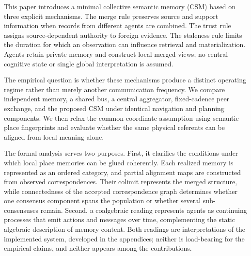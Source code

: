 \documentclass{article}
\begin{document}
This paper introduces a minimal collective semantic memory (CSM) based
on three explicit mechanisms. The merge rule preserves source and
support information when records from different agents are combined.
The trust rule assigns source-dependent authority to foreign evidence.
The staleness rule limits the duration for which an observation can
influence retrieval and materialization. Agents retain private memory
and construct local merged views; no central cognitive state or
single global interpretation is assumed.

The empirical question is whether these mechanisms produce a distinct
operating regime rather than merely another communication frequency.
We compare independent memory, a shared bus, a central aggregator,
fixed-cadence peer exchange, and the proposed CSM under identical
navigation and planning components. We then relax the common-coordinate
assumption using semantic place fingerprints and evaluate whether the
same physical referents can be aligned from local meaning alone.

The formal analysis serves two purposes. First, it clarifies the
conditions under which local place memories can be glued coherently.
Each realized memory is represented as an ordered category, and
partial alignment maps are constructed from observed correspondences.
Their colimit represents the merged structure, while connectedness of
the accepted correspondence graph determines whether one consensus
component spans the population or whether several sub-consensuses
remain. Second, a coalgebraic reading represents agents as continuing
processes that emit actions and messages over time, complementing the
static algebraic description of memory content. Both readings are
interpretations of the implemented system, developed in the
appendices; neither is load-bearing for the empirical claims, and
neither appears among the contributions.
\end{document}
